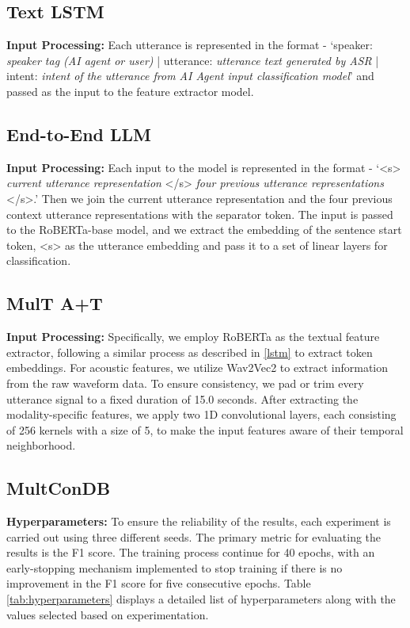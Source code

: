 \subsection{Text LSTM}
\label{sec:model_config:text_lstm}
\textbf{Input Processing:} Each utterance is represented in the format -  `speaker: \textit{speaker tag (AI agent or user)} | utterance: \textit{utterance text generated by ASR} | intent: \textit{intent of the utterance from AI Agent input classification model}' and passed as the input to the feature extractor model.
\subsection{End-to-End LLM}
\label{sec:model_config:e2e_llm}
\textbf{Input Processing:} Each input to the model is represented in the format - `<s> \textit{current utterance representation} </s> \textit{four previous utterance representations} </s>.' Then we join the current utterance representation and the four previous context utterance representations with the separator token. The input is passed to the RoBERTa-base model, and we extract the embedding of the sentence start token, <s> as the utterance embedding and pass it to a set of linear layers for classification.
\subsection{MulT A+T}
\label{sec:model_config:mult_at}
\textbf{Input Processing:} Specifically, we employ RoBERTa as the textual feature extractor, following a similar process as described in \ref{lstm} to extract token embeddings. For acoustic features, we utilize Wav2Vec2 \cite{10.5555/3495724.3496768} to extract information from the raw waveform data. To ensure consistency, we pad or trim every utterance signal to a fixed duration of 15.0 seconds. After extracting the modality-specific features, we apply two 1D convolutional layers, each consisting of 256 kernels with a size of 5, to make the input features aware of their temporal neighborhood.
\subsection{MultConDB} \label{sec:model_config:multcondb}

\textbf{Hyperparameters:} To ensure the reliability of the results, each experiment is carried out using three different seeds. The primary metric for evaluating the results is the F1 score. The training process continue for 40 epochs, with an early-stopping mechanism implemented to stop training if there is no improvement in the F1 score for five consecutive epochs. Table \ref{tab:hyperparameters} displays a detailed list of hyperparameters along with the values selected based on experimentation.


